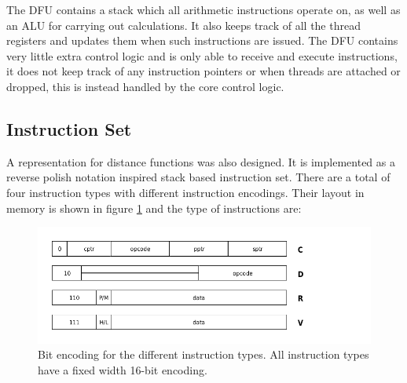 			The DFU contains a stack which all arithmetic instructions operate
			on, as well as an ALU for carrying out calculations. It also keeps
			track of all the thread registers and updates them when such
			instructions are issued. The DFU contains very little extra control
			logic and is only able to receive and execute instructions, it does
			not keep track of any instruction pointers or when threads are
			attached or dropped, this is instead handled by the core control
			logic.

		\subsection{Instruction Set}

			A representation for distance functions was also designed. It is
			implemented as a reverse polish notation inspired stack based instruction
			set. There are a total of four instruction types with different
			instruction encodings. Their layout in memory is shown in figure
			\ref{encodingfig} and the type of instructions are:

			\begin{figure}
				\centering
				\caption{Bit encoding for the different instruction types. All
					instruction types have a fixed width 16-bit encoding.}
				\label{encodingfig}
				\includegraphics[width=0.75\linewidth]{figure/pdf/instruction_layout} 
			\end{figure}


